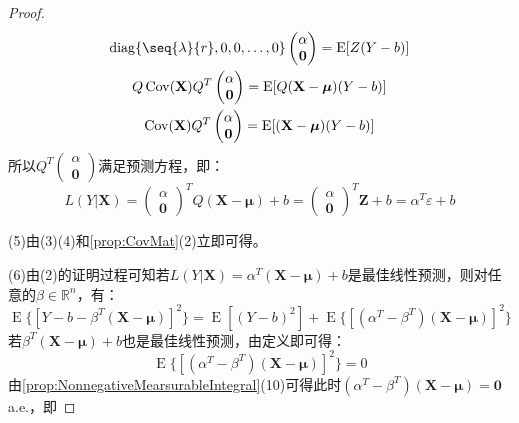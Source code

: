 \begin{proof}
\begin{gather*}
		\operatorname{diag}\{\seq{\lambda}{r},0,0,\dots,0\}
		\begin{pmatrix}
			\alpha \\
			\mathbf{0}	
		\end{pmatrix}=\operatorname{E}[Z(Y-b)] \\
		Q\operatorname{Cov}(\mathbf{X})Q^T
		\begin{pmatrix}
			\alpha \\
			\mathbf{0}	
		\end{pmatrix}=\operatorname{E}[Q(\mathbf{X}-\boldsymbol{\mu})(Y-b)] \\
		\operatorname{Cov}(\mathbf{X})Q^T
		\begin{pmatrix}
			\alpha \\
			\mathbf{0}	
		\end{pmatrix}=\operatorname{E}[(\mathbf{X}-\boldsymbol{\mu})(Y-b)] 
	\end{gather*}
	所以$Q^T
	\begin{pmatrix}
		\alpha \\
		\mathbf{0}
	\end{pmatrix}$满足预测方程，即：
	\begin{equation*}
		L(Y|\mathbf{X})=
		\begin{pmatrix}
			\alpha \\
			\mathbf{0}
		\end{pmatrix}^TQ(\mathbf{X}-\boldsymbol{\mu})+b=
		\begin{pmatrix}
		\alpha \\
		\mathbf{0}
		\end{pmatrix}^T\mathbf{Z}+b=\alpha^T\varepsilon+b
	\end{equation*}\par
	(5)由(3)(4)和\cref{prop:CovMat}(2)立即可得。\par
	(6)由(2)的证明过程可知若$L(Y|\mathbf{X})=\alpha^T(\mathbf{X}-\boldsymbol{\mu})+b$是最佳线性预测，则对任意的$\beta\in\mathbb{R}^{n}$，有：
	\begin{equation*}
		\operatorname{E}\{[Y-b-\beta^T(\mathbf{X}-\boldsymbol{\mu})]^2\}=\operatorname{E}[(Y-b)^2]+\operatorname{E}\{[(\alpha^T-\beta^T)(\mathbf{X}-\boldsymbol{\mu})]^2\}
	\end{equation*}
	若$\beta^T(\mathbf{X}-\boldsymbol{\mu})+b$也是最佳线性预测，由定义即可得：
	\begin{equation*}
		\operatorname{E}\{[(\alpha^T-\beta^T)(\mathbf{X}-\boldsymbol{\mu})]^2\}=0
	\end{equation*}
	由\cref{prop:NonnegativeMearsurableIntegral}(10)可得此时$(\alpha^T-\beta^T)(\mathbf{X}-\boldsymbol{\mu})=\mathbf{0}\;$a.e.，即

\end{proof}
